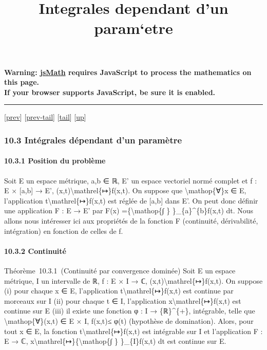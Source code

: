 \documentclass[]{article}
\title{Integrales dependant d'un param`etre}
\author{}
\date{}
\begin{document}
\maketitle

\textbf{Warning: \href{http://www.math.union.edu/locate/jsMath}{jsMath}
requires JavaScript to process the mathematics on this page.\\ If your
browser supports JavaScript, be sure it is enabled.}

\begin{center}\rule{3in}{0.4pt}\end{center}

{[}\href{coursse61.html}{prev}{]}
{[}\href{coursse61.html\#tailcoursse61.html}{prev-tail}{]}
{[}\hyperref[tailcoursse62.html]{tail}{]}
{[}\href{coursch11.html\#coursse62.html}{up}{]}

\subsubsection{10.3 Intégrales dépendant d'un paramètre}

\paragraph{10.3.1 Position du problème}

Soit E un espace métrique, a,b ∈ ℝ, E' un espace vectoriel normé complet
et f : E × {[}a,b{]} → E', (x,t)\textbackslash{}mathrel\{↦\}f(x,t). On
suppose que \textbackslash{}mathop\{∀\}x ∈ E, l'application
t\textbackslash{}mathrel\{↦\}f(x,t) est réglée de {[}a,b{]} dans E'. On
peut donc définir une application F : E → E' par F(x)
=\{\textbackslash{}mathop\{∫ \} \}\_\{a\}\^{}\{b\}f(x,t) dt. Nous allons
nous intéresser ici aux propriétés de la fonction F (continuité,
dérivabilité, intégration) en fonction de celles de f.

\paragraph{10.3.2 Continuité}

Théorème~10.3.1~(Continuité par convergence dominée) Soit E un espace
métrique, I un intervalle de ℝ, f : E × I → ℂ,
(x,t)\textbackslash{}mathrel\{↦\}f(x,t). On suppose (i) pour chaque x ∈
E, l'application t\textbackslash{}mathrel\{↦\}f(x,t) est continue par
morceaux sur I (ii) pour chaque t ∈ I, l'application
x\textbackslash{}mathrel\{↦\}f(x,t) est continue sur E (iii) il existe
une fonction φ : I → \{ℝ\}\^{}\{+\}, intégrable, telle que
\textbackslash{}mathop\{∀\}(x,t) ∈ E × I, \textbar{}f(x,t)\textbar{}≤
φ(t) (hypothèse de domination). Alors, pour tout x ∈ E, la fonction
t\textbackslash{}mathrel\{↦\}f(x,t) est intégrable sur I et
l'application F : E → ℂ,
x\textbackslash{}mathrel\{↦\}\{\textbackslash{}mathop\{∫ \}
\}\_\{I\}f(x,t) dt est continue sur E.
\end{document}
